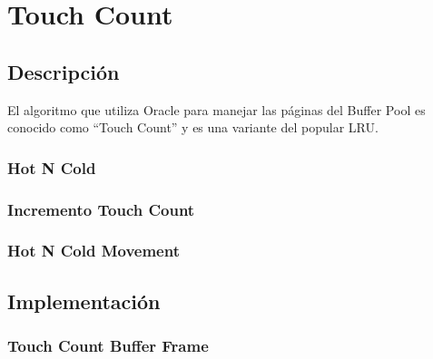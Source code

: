 \section{Touch Count}

\subsection{Descripción}
El algoritmo que utiliza Oracle para manejar las páginas del Buffer Pool es conocido
como “Touch Count” y es una variante del popular LRU.

\subsubsection{Hot N Cold}

\subsubsection{Incremento Touch Count}

\subsubsection{Hot N Cold Movement}

\subsection{Implementación}
\subsubsection{Touch Count Buffer Frame}

